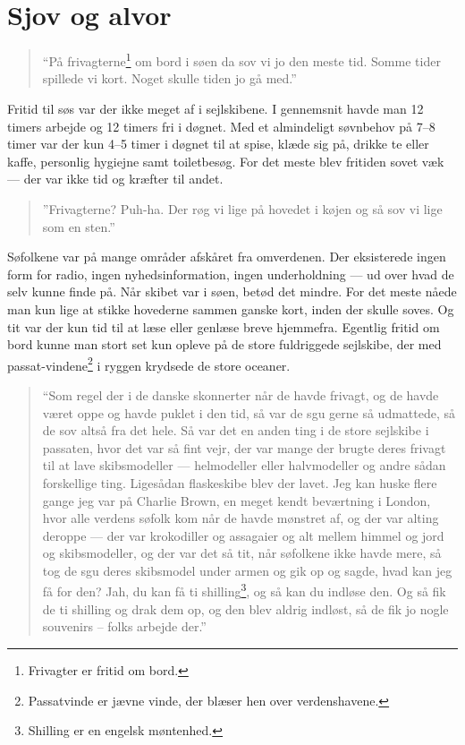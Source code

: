 \chapter{Sjov og alvor}\label{sjov-og-alvor}

\begin{quote}
``På frivagterne\footnote{Frivagter er fritid om bord.} om bord i søen
da sov vi jo den meste tid. Somme tider spillede vi kort. Noget skulle
tiden jo gå med.''
\end{quote}

Fritid til søs var der ikke meget af i sejlskibene. I gennemsnit havde
man 12 timers arbejde og 12 timers fri i døgnet. Med et almindeligt
søvnbehov på 7--8 timer var der kun 4--5 timer i døgnet til at spise,
klæde sig på, drikke te eller kaffe, personlig hygiejne samt
toiletbesøg. For det meste blev fritiden sovet væk --- der var ikke tid
og kræfter til andet.

\begin{quote}
''Frivagterne? Puh-ha. Der røg vi lige på hovedet i køjen og så sov vi
lige som en sten.''
\end{quote}

Søfolkene var på mange områder afskåret fra omverdenen. Der eksisterede
ingen form for radio, ingen nyhedsinformation, ingen underholdning ---
ud over hvad de selv kunne finde på. Når skibet var i søen, betød det
mindre. For det meste nåede man kun lige at stikke hovederne sammen
ganske kort, inden der skulle soves. Og tit var der kun tid til at læse
eller genlæse breve hjemmefra. Egentlig fritid om bord kunne man stort
set kun opleve på de store fuldriggede sejlskibe, der med
passat-vindene\footnote{Passatvinde er jævne vinde, der blæser hen over
  verdenshavene.} i ryggen krydsede de store oceaner.

\begin{quote}
``Som regel der i de danske skonnerter når de havde frivagt, og de havde
været oppe og havde puklet i den tid, så var de sgu gerne så udmattede,
så de sov altså fra det hele. Så var det en anden ting i de store
sejlskibe i passaten, hvor det var så fint vejr, der var mange der
brugte deres frivagt til at lave skibsmodeller --- helmodeller eller
halvmodeller og andre sådan forskellige ting. Ligesådan flaskeskibe blev
der lavet. Jeg kan huske flere gange jeg var på Charlie Brown, en meget
kendt beværtning i London, hvor alle verdens søfolk kom når de havde
mønstret af, og der var alting deroppe --- der var krokodiller og
assagaier og alt mellem himmel og jord og skibsmodeller, og der var det
så tit, når søfolkene ikke havde mere, så tog de sgu deres skibsmodel
under armen og gik op og sagde, hvad kan jeg få for den? Jah, du kan få
ti shilling\footnote{Shilling er en engelsk møntenhed.}, og så kan du
indløse den. Og så fik de ti shilling og drak dem op, og den blev aldrig
indløst, så de fik jo nogle souvenirs -- folks arbejde der.''
\end{quote}


